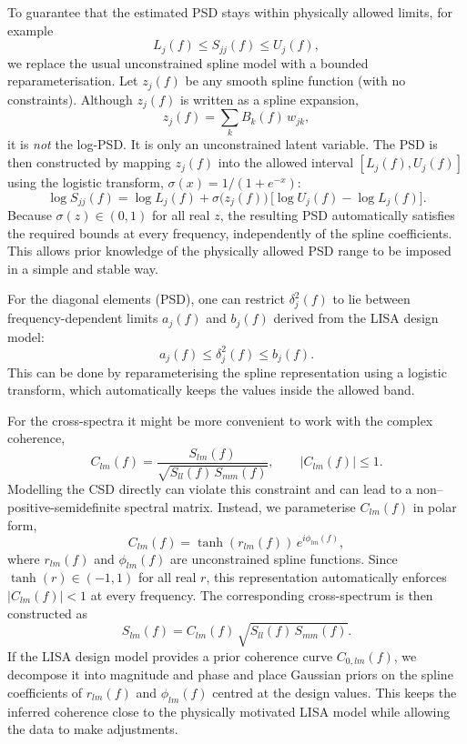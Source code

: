 To guarantee that the estimated PSD stays within physically allowed
limits, for example
$$ L_j(f) \le S_{jj}(f) \le U_j(f),$$
we replace the usual unconstrained spline model with a bounded reparameterisation.  
Let $z_j(f)$ be any smooth spline function (with no constraints).  
Although $z_j(f)$ is written as a spline expansion,
$$
  z_j(f) = \sum_k B_k(f)\, w_{jk},
$$
it is \emph{not} the log-PSD.  
It is only an unconstrained latent variable.  
The PSD is then constructed by mapping $z_j(f)$ into the allowed interval $[L_j(f), U_j(f)]$ using the logistic transform, $\sigma(x)=1/(1+e^{-x})$:
$$
  \log S_{jj}(f)
    = \log L_j(f)
      + \sigma\!\big(z_j(f)\big)\,
        \big[\log U_j(f)-\log L_j(f)\big].
$$
Because $\sigma(z)\in(0,1)$ for all real $z$, the resulting PSD automatically satisfies the required bounds at every frequency, independently of the spline coefficients.  
This allows prior knowledge of the physically allowed PSD range to be imposed in a simple and stable way.

For the diagonal elements (PSD), one can restrict $\delta_j^2(f)$ to lie between frequency-dependent limits $a_j(f)$ and
$b_j(f)$ derived from the LISA design model:
$$  a_j(f) \le \delta_j^2(f) \le b_j(f).$$
This can be done by reparameterising the spline representation using a logistic transform, which automatically keeps the values inside the allowed band.


For the cross-spectra it might be more convenient to work with the complex coherence,
$$
  C_{lm}(f)
    = \frac{S_{lm}(f)}
           {\sqrt{S_{ll}(f)\,S_{mm}(f)}},
\qquad
  |C_{lm}(f)| \le 1.
$$
Modelling the CSD directly can violate this constraint and can lead to
a non–positive-semidefinite spectral matrix.  Instead, we parameterise
$C_{lm}(f)$ in polar form,
$$
  C_{lm}(f) = \tanh(r_{lm}(f))\,e^{i\phi_{lm}(f)},
$$
where $r_{lm}(f)$ and $\phi_{lm}(f)$ are unconstrained spline functions.  
Since $\tanh(r)\in(-1,1)$ for all real $r$, this representation automatically enforces $|C_{lm}(f)|<1$ at every frequency. 
The corresponding cross-spectrum is then constructed as
$$
  S_{lm}(f)
    = C_{lm}(f)\,\sqrt{S_{ll}(f)\,S_{mm}(f)}.
$$
If the LISA design model provides a prior coherence curve $C_{0,lm}(f)$, we decompose it into magnitude and phase and place Gaussian priors on the spline coefficients of $r_{lm}(f)$ and $\phi_{lm}(f)$ centred at the design values.  
This keeps the inferred coherence close to the physically motivated LISA model while allowing the data to make adjustments.



